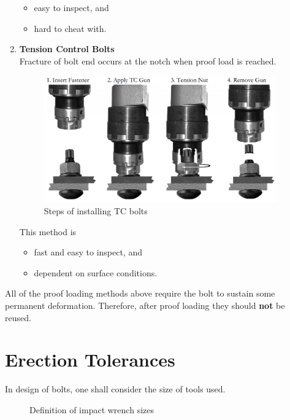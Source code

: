 \begin{enumerate}
\begin{itemize}
\item easy to inspect, and
\item hard to cheat with.
\end{itemize}
\item \textbf{Tension Control Bolts}\\Fracture of bolt end occurs at the notch when proof load is reached.
\begin{figure}[H]
\centering
\includegraphics[width=10cm]{PIC/CH06/TCB}\caption{Steps of installing TC bolts}
\end{figure}
This method is
\begin{itemize}
\item fast and easy to inspect, and
\item dependent on surface conditions.
\end{itemize}
\end{enumerate}
All of the proof loading methods above require the bolt to sustain some permanent deformation. Therefore, after proof loading they should \textbf{not} be reused.
\section{Erection Tolerances}
In design of bolts, one shall consider the size of tools used.
\begin{figure}[H]
\centering\caption{Definition of impact wrench sizes \citep{ASI2016}}
\end{figure}

